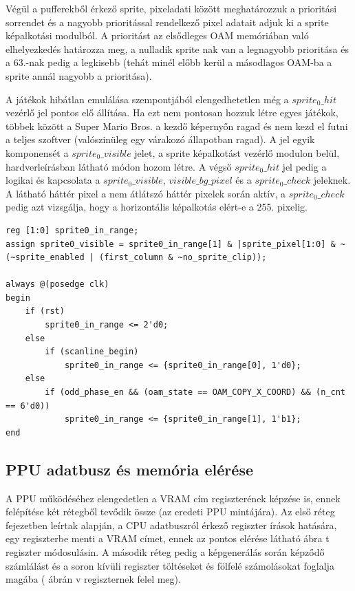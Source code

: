 	Végül a pufferekből érkező sprite, pixeladati között meghatározzuk a prioritási sorrendet és a nagyobb prioritással rendelkező pixel adatait adjuk ki a sprite képalkotási modulból. A prioritást az elsődleges OAM memóriában való elhelyezkedés határozza meg, a nulladik sprite nak van a legnagyobb prioritása és a 63.-nak pedig a legkisebb (tehát minél előbb kerül a másodlagos OAM-ba a sprite annál nagyobb a prioritása).
	
	A játékok hibátlan emulálása szempontjából elengedhetetlen még a $sprite_0\_hit$ vezérlő jel pontos elő állítása. Ha ezt nem pontosan hozzuk létre egyes játékok, többek között a Super Mario Bros. a kezdő képernyőn ragad és nem kezd el futni a teljes szoftver (valószinüleg egy várakozó állapotban ragad). A jel egyik komponensét a $sprite_0\_visible$ jelet, a sprite képalkotást vezérlő modulon belül,  hardverleírásban látható módon hozom létre. A végső $sprite_0\_hit$ jel pedig a logikai és kapcsolata a $sprite_0\_visible$, $visible\_bg\_pixel$ és a $sprite_0\_check$ jeleknek. A látható háttér pixel a nem átlátszó háttér pixelek során aktív, a $sprite_0\_check$ pedig azt vizsgálja, hogy a horizontális képalkotás elért-e a 255. pixelig. 

\begin{lstlisting}[caption={A $sprite_0\_visible$ vezérlő jel elő állítása}, label={code:sprite0-visible}, style=prettyverilog]
reg [1:0] sprite0_in_range;
assign sprite0_visible = sprite0_in_range[1] & |sprite_pixel[1:0] & ~(~sprite_enabled | (first_column & ~no_sprite_clip)); 

always @(posedge clk) 
begin
	if (rst)
		sprite0_in_range <= 2'd0;
	else
		if (scanline_begin)
			sprite0_in_range <= {sprite0_in_range[0], 1'd0};
	else
		if (odd_phase_en && (oam_state == OAM_COPY_X_COORD) && (n_cnt == 6'd0))
			sprite0_in_range <= {sprite0_in_range[1], 1'b1};
end\end{lstlisting} 

	\subsection{PPU adatbusz és memória elérése}
	
	A PPU működéséhez elengedetlen a VRAM cím regiszterének képzése is, ennek felépítése két rétegből tevődik össze (az eredeti PPU mintájára). Az első réteg  fejezetben leírtak alapján, a CPU adatbuszról érkező regiszter írások hatására, egy regiszterbe menti a VRAM címet, ennek az pontos elérése látható  ábra t regiszter módosulásin. A második réteg pedig a képgenerálás során képződő számlálást és a soron kívüli regiszter töltéseket és fölfelé számolásokat foglalja magába ( ábrán v regiszternek felel meg).
	
